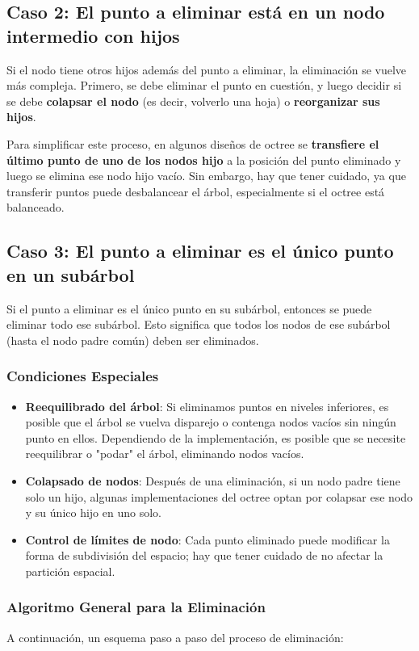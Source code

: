 \documentclass{article}
\begin{document}
\subsection*{Caso 2: El punto a eliminar está en un nodo intermedio con hijos}
Si el nodo tiene otros hijos además del punto a eliminar, la eliminación se vuelve más compleja. Primero, se debe eliminar el punto en cuestión, y luego decidir si se debe \textbf{colapsar el nodo} (es decir, volverlo una hoja) o \textbf{reorganizar sus hijos}.

Para simplificar este proceso, en algunos diseños de octree se \textbf{transfiere el último punto de uno de los nodos hijo} a la posición del punto eliminado y luego se elimina ese nodo hijo vacío. Sin embargo, hay que tener cuidado, ya que transferir puntos puede desbalancear el árbol, especialmente si el octree está balanceado.

\subsection*{Caso 3: El punto a eliminar es el único punto en un subárbol}
Si el punto a eliminar es el único punto en su subárbol, entonces se puede eliminar todo ese subárbol. Esto significa que todos los nodos de ese subárbol (hasta el nodo padre común) deben ser eliminados.

\subsubsection{Condiciones Especiales}
\begin{itemize}
    \item \textbf{Reequilibrado del árbol}: Si eliminamos puntos en niveles inferiores, es posible que el árbol se vuelva disparejo o contenga nodos vacíos sin ningún punto en ellos. Dependiendo de la implementación, es posible que se necesite reequilibrar o "podar" el árbol, eliminando nodos vacíos.
    \item \textbf{Colapsado de nodos}: Después de una eliminación, si un nodo padre tiene solo un hijo, algunas implementaciones del octree optan por colapsar ese nodo y su único hijo en uno solo.
    \item \textbf{Control de límites de nodo}: Cada punto eliminado puede modificar la forma de subdivisión del espacio; hay que tener cuidado de no afectar la partición espacial.
\end{itemize}

\subsubsection{Algoritmo General para la Eliminación}
A continuación, un esquema paso a paso del proceso de eliminación:
\end{document}

